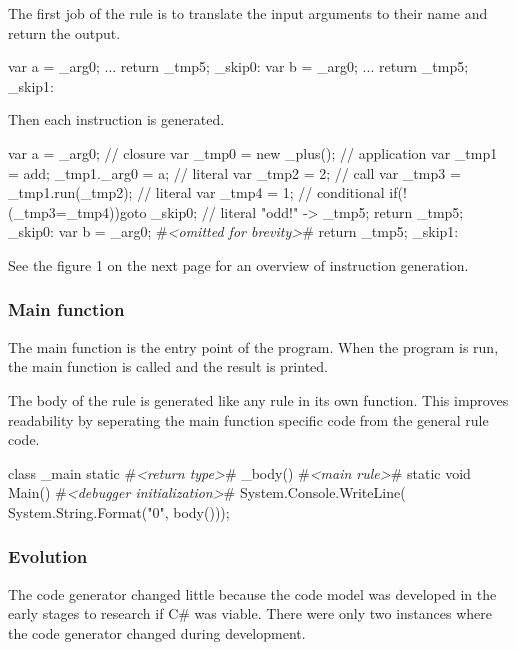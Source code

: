 The first job of the rule is to translate the input arguments to their name and return the output.

\begin{CS}
    {
        var a = _arg0; 
        ...
        return _tmp5;
    }
    _skip0:
    {
        var b = _arg0;
        ...
        return _tmp5;
    }
    _skip1:
\end{CS}

Then each instruction is generated.

\begin{CS}[escapeinside=\#\#]
    {
        var a = _arg0; 
        // closure
        var _tmp0 = new _plus(); 
        // application
        var _tmp1 = add;
        _tmp1._arg0 = a;
        // literal
        var _tmp2 = 2;
        // call
        var _tmp3 = _tmp1.run(_tmp2);
        // literal     
        var _tmp4 = 1;
        // conditional
        if(!(_tmp3=_tmp4)){goto _skip0;}
        // literal
        "odd!" -> _tmp5;
        return _tmp5;
    }
    _skip0:
    {
        var b = _arg0;
        #\textit{<omitted for brevity>}#
        return _tmp5;
    }
    _skip1:
\end{CS}

See the figure 1 on the next page for an overview of instruction generation.


\subsubsection{Main function}
The main function is the entry point of the program.
When the program is run, the main function is called and the result is printed.

The body of the rule is generated like any rule in its own function.
This improves readability by seperating the main function specific code from the general rule code.

\begin{CS}[escapeinside=\#\#]
class _main{
    static #\textit{<return type>}# _body(){
        #\textit{<main rule>}#
    }
    static void Main(){
        #\textit{<debugger initialization>}#
        System.Console.WriteLine(
            System.String.Format("{0}", 
                                 body()));
    }
}
\end{CS}


\subsubsection{Evolution}
The code generator changed little because the code model was developed in the early stages to research if C\# was viable.
There were only two instances where the code generator changed during development.

